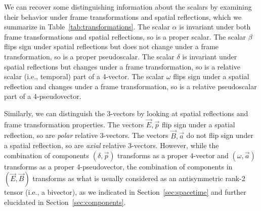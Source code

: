 \documentclass[1p,sort&compress]{elsarticle}
\numberwithin{equation}{section}
\newcommand{\rv}[1]{\vec{#1}}
\begin{document}
We can recover some distinguishing information about the scalars by examining their behavior under frame transformations and spatial reflections, which we summarize in Table~\ref{tab:transformations}.  The scalar $\alpha$ is invariant under both frame transformations and spatial reflections, so is a proper scalar.  The scalar $\beta$ flips sign under spatial reflections but does not change under a frame transformation, so is a proper pseudoscalar.  The scalar $\delta$ is invariant under spatial reflections but changes under a frame transformation, so is a relative scalar (i.e., temporal) part of a 4-vector.  The scalar $\omega$ flips sign under a spatial reflection and changes under a frame transformation, so is a relative pseudoscalar part of a 4-pseudovector.  

Similarly, we can distinguish the 3-vectors by looking at spatial reflections and frame transformation properties.  The vectors $\rv{E},\rv{p}$ flip sign under a spatial reflection, so are \emph{polar} relative 3-vectors.  The vectors $\rv{B},\rv{a}$ do not flip sign under a spatial reflection, so are \emph{axial} relative 3-vectors.  However, while the combination of components $(\delta,\rv{p})$ transforms as a proper 4-vector and $(\omega,\rv{a})$ transforms as a proper 4-pseudovector, the combination of components in $(\rv{E},\rv{B})$ transforms as what is usually considered as an antisymmetric rank-2 tensor (i.e., a bivector), as we indicated in Section~\ref{sec:spacetime} and further elucidated in Section~\ref{sec:components}.  
\end{document}

